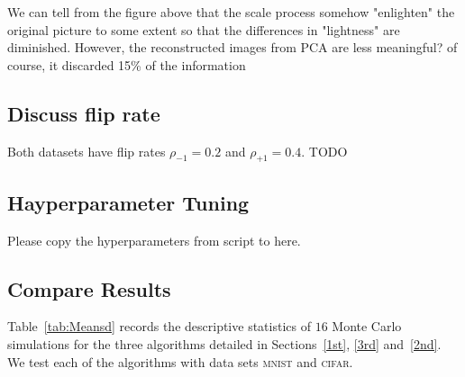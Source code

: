 \documentclass[12pt]{article} %
\newcommand{\rhoo}{\rho_{+1}}
\newcommand{\rhoz}{\rho_{-1}}
\begin{document}
We can tell from the figure above that the scale process somehow "enlighten" the original picture to some extent so that the differences in "lightness" are diminished. 
{\color{red} However, the reconstructed images from PCA are less meaningful? of course, it discarded 15\% of the information}


\subsection{Discuss flip rate}

Both datasets have flip rates $\rhoz=0.2$ and $\rhoo=0.4$.
{\color{red} TODO }

\subsection{Hayperparameter Tuning}
Please copy the hyperparameters from script to here.

\subsection{Compare Results}

Table~\ref{tab:Meansd} records the descriptive statistics of $16$ Monte Carlo simulations for the three algorithms detailed in Sections~\ref{1st}, \ref{3rd} and~\ref{2nd}.  We test each of the algorithms with data sets \textsc{mnist} and \textsc{cifar}.
\end{document}

